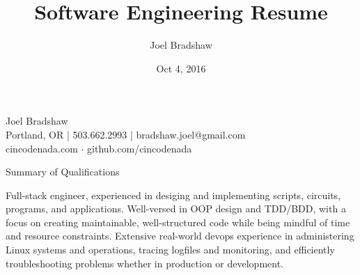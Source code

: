 \documentclass[letterpaper,10pt]{article}
\begin{document}
\sffamily
\title{Software Engineering Resume}
\author{Joel Bradshaw}
\date{Oct 4, 2016}
\begin{center}
{\Huge Joel Bradshaw}\\
\vskip 2pt
{\large
    Portland, OR | 503.662.2993 | bradshaw.joel@gmail.com\\
    cincodenada.com \ensuremath{\cdot} github.com/cincodenada}
\end{center}
\vskip -8pt

\rmfamily
\begin{res_section}{Summary of Qualifications}
  \rmfamily

  Full-stack engineer, experienced in desiging and implementing scripts, circuits, programs, and applications.
  Well-versed in OOP design and TDD/BDD, with a focus on creating maintainable, well-structured code while being mindful of time and resource constraints.
  Extensive real-world devops experience in administering Linux systems and operations, tracing logfiles and monitoring,
  and efficiently troubleshooting problems whether in production or development.


\end{res_section}
\end{document}
